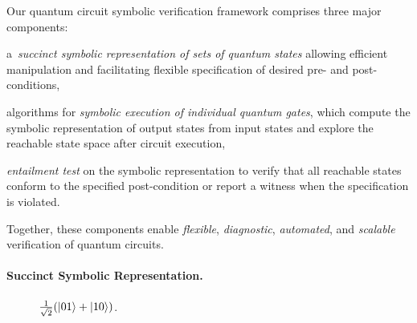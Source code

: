 %
%
Our quantum circuit symbolic verification framework comprises three major components:
\begin{inparaenum}
\item a~\emph{succinct symbolic representation of sets of quantum states} allowing efficient manipulation and facilitating flexible specification of desired pre- and post-conditions,
\item algorithms for \emph{symbolic execution of individual quantum gates}, which compute the symbolic representation of output states from input states and explore the reachable state space after circuit execution,
\item \emph{entailment test} on the symbolic representation to verify that all reachable states conform to the specified post-condition or report a witness when the specification is violated.
\end{inparaenum}
Together, these components enable \emph{flexible}, \emph{diagnostic}, \emph{automated}, and \emph{scalable} verification of quantum circuits.

\paragraph{Succinct Symbolic Representation.}

\begin{wrapfigure}[8]{r}{0.23\textwidth}
\centering
\vspace{-0.4cm}
\vspace{-0.3cm}
\caption{$\frac{1}{\sqrt{2}}(\ket{01}+\ket{10})$.}
\label{fig:state}
\end{wrapfigure}


